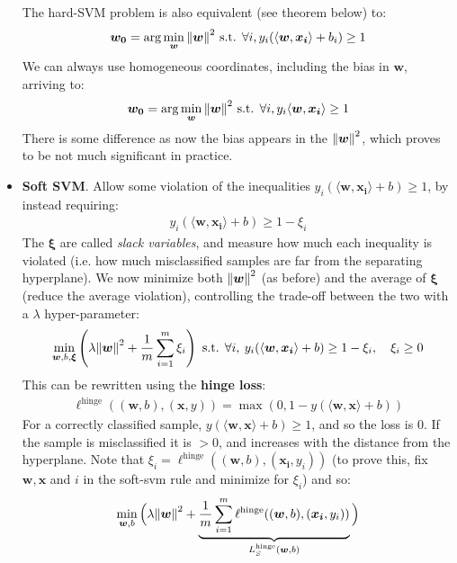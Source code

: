 \documentclass[../template.tex]{subfiles}
\begin{document}
\begin{itemize}
    The hard-SVM problem is also equivalent (see theorem below) to:
    \begin{align*}
        \bm{w_0} = \arg\min_{\bm{w}} \norm{\bm{w}}^2 \text{ s.t. } \forall i, y_i (\langle \bm{w}, \bm{x_i} \rangle  + b_i) \geq 1 
    \end{align*}
    We can always use homogeneous coordinates, including the bias in $\bm{w}$, arriving to:
    \begin{align*}
        \bm{w_0} = \arg\min_{\bm{w}} \norm{\bm{w}}^2 \text{ s.t. } \forall i, y_i \langle \bm{w}, \bm{x_i} \rangle \geq 1 
    \end{align*}
    There is some difference as now the bias appears in the $\norm{\bm{w}}^2$, which proves to be not much significant in practice.
    
    \item \textbf{Soft SVM}. Allow some violation of the inequalities $y_i (\langle \bm{w}, \bm{x_i} \rangle + b) \geq 1$, by instead requiring:
    \begin{align*}
        y_i (\langle \bm{w}, \bm{x_i} \rangle + b) \geq 1- \xi_i
    \end{align*}
    The $\bm{\xi}$ are called \textit{slack variables}, and measure how much each inequality is violated (i.e. how much misclassified samples are far from the separating hyperplane). We now minimize both $\norm{\bm{w}}^2$ (as before) and the average of $\bm{\xi}$ (reduce the average violation), controlling the trade-off between the two with a $\lambda$ hyper-parameter:
    \begin{align*}
        \min_{\bm{w}, b, \bm{\xi}} \left(\lambda \norm{\bm{w}}^2 + \frac{1}{m} \sum_{i=1}^m \xi_i \right) \text{ s.t. } \forall i, \> y_i (\langle \bm{w}, \bm{x_i} \rangle + b) \geq 1- \xi_i, \quad \xi_i \geq0  
    \end{align*}
    This can be rewritten using the \textbf{hinge loss}:
    \begin{align*}
        \ell^{\mathrm{hinge}}((\bm{w}, b), (\bm{x}, y)) = \max(0, 1- y(\langle \bm{w}, \bm{x} \rangle + b))
    \end{align*} 
    For a correctly classified sample, $y (\langle \bm{w}, \bm{x} \rangle + b) \geq 1$, and so the loss is $0$. If the sample is misclassified it is $> 0$, and increases with the distance from the hyperplane. Note that $\xi_i = \ell^{\mathrm{hinge}}((\bm{w}, b), (\bm{x_i}, y_i))$ (to prove this, fix $\bm{w}, \bm{x}$ and $i$ in the soft-svm rule and minimize for $\xi_i$) and so:
    \begin{align*}
        \min_{\bm{w},b} \Big(\lambda \norm{\bm{w}}^2 + \underbrace{\frac{1}{m} \sum_{i=1}^m \ell^{\mathrm{hinge}}((\bm{w}, b), (\bm{x_i}, y_i))}_{L_S^{\mathrm{hinge} }(\bm{w},b)} \Big)
    \end{align*} 
\end{itemize}
\end{document}
